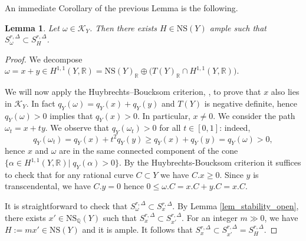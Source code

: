 \documentclass[12pt,a4paper]{amsart}
\theoremstyle{plain}
\newtheorem{lem}[thm]{Lemma}
\theoremstyle{definition}
\theoremstyle{remark}
\def\H{H}
\newcommand{\RR}{\mathbb{R}}
\newcommand{\NS}{\mathrm{NS}}
\begin{document}
An immediate Corollary of the previous Lemma is the following.
\begin{lem}\label{lem_omegaimpliesH}
    Let $\omega\in\mathcal{K}_Y$. Then there exists $H\in\NS(Y)$ ample such that $S^{r,\Delta}_\omega\subset S^{r,\Delta}_{H}$.
\end{lem}
\begin{proof}
We decompose $\omega = x + y \in \H^{1,1}(Y,\mathbb{R}) = \NS(Y)_{\mathbb{R}} \oplus \big(T(Y)_{\mathbb{R}} \cap \H^{1,1}(Y,\mathbb{R})\big)$. 

We will now apply the Huybrechts--Boucksom criterion,  \cite[Théorème 1.2]{boucksom}, to prove that $x$ also lies in $\mathcal{K}_Y$. In fact $q_Y(\omega)=q_Y(x)+q_Y(y)$ and $T(Y)$ is negative definite, hence $q_Y(\omega)>0$ implies that $q_Y(x)>0$. In particular, $x\neq 0$. 
We consider the path $\omega_t=x+ty$.
We observe that $q_Y(\omega_t)>0$ for all $t\in [0,1]$: indeed, 
\[q_Y(\omega_t)=q_Y(x)+t^2q_Y(y)\ge q_Y(x)+q_Y(y)=q_Y(\omega)>0,\]
hence $x$ and $\omega$ are in the same connected component of the cone $\{\alpha\in \H^{1,1}(Y,\RR)|\;q_Y(\alpha)>0\}$. 
By the Huybrechts-Boucksom criterion  it suffices to check that for any rational curve $C\subset Y$ we have $C.x\geq 0$.
Since $y$ is transcendental, we have $C.y=0$ hence $0\leq \omega.C=x.C+y.C=x.C$.

It is straightforward to check that $S^{r,\Delta}_\omega\subset S^{r,\Delta}_{x}$. By Lemma \ref{lem_stability_open}, there exists $x'\in\NS_{\mathbb{Q}}(Y)$ such that $S^{r,\Delta}_{x}\subset S^{r,\Delta}_{x'}$. For an integer $m\gg 0$, we have $H:=mx'\in\NS(Y)$ and it is ample. It follows that $S^{r,\Delta}_{x}\subset S^{r,\Delta}_{x'}=S^{r,\Delta}_{H}$.
\end{proof}
\end{document}

